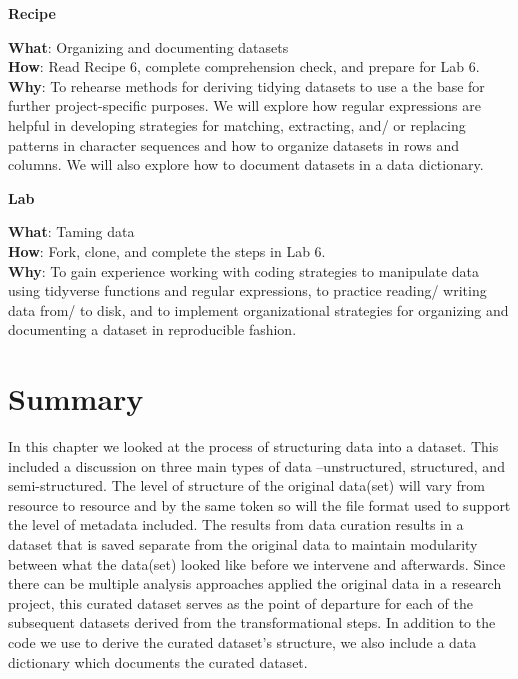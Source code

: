 \documentclass[
  letterpaper,
]{latex/krantz}
\theoremstyle{definition}
\theoremstyle{remark}
\begin{document}
\begin{tcolorbox}[enhanced jigsaw, breakable, leftrule=.75mm, arc=.35mm, colframe=quarto-callout-color-frame, colback=white, left=2mm, bottomrule=.15mm, rightrule=.15mm, toprule=.15mm, opacityback=0]

\textbf{ Recipe}

\textbf{What}: Organizing and documenting datasets\\
\textbf{How}: Read Recipe 6, complete comprehension check, and prepare
for Lab 6.\\
\textbf{Why}: To rehearse methods for deriving tidying datasets to use a
the base for further project-specific purposes. We will explore how
regular expressions are helpful in developing strategies for matching,
extracting, and/ or replacing patterns in character sequences and how to
organize datasets in rows and columns. We will also explore how to
document datasets in a data dictionary.

\end{tcolorbox}

\begin{tcolorbox}[enhanced jigsaw, breakable, leftrule=.75mm, arc=.35mm, colframe=quarto-callout-color-frame, colback=white, left=2mm, bottomrule=.15mm, rightrule=.15mm, toprule=.15mm, opacityback=0]

\textbf{ Lab}

\textbf{What}: Taming data\\
\textbf{How}: Fork, clone, and complete the steps in Lab 6.\\
\textbf{Why}: To gain experience working with coding strategies to
manipulate data using tidyverse functions and regular expressions, to
practice reading/ writing data from/ to disk, and to implement
organizational strategies for organizing and documenting a dataset in
reproducible fashion.

\end{tcolorbox}

\section*{Summary}\label{summary-5}


In this chapter we looked at the process of structuring data into a
dataset. This included a discussion on three main types of data
--unstructured, structured, and semi-structured. The level of structure
of the original data(set) will vary from resource to resource and by the
same token so will the file format used to support the level of metadata
included. The results from data curation results in a dataset that is
saved separate from the original data to maintain modularity between
what the data(set) looked like before we intervene and afterwards. Since
there can be multiple analysis approaches applied the original data in a
research project, this curated dataset serves as the point of departure
for each of the subsequent datasets derived from the transformational
steps. In addition to the code we use to derive the curated dataset's
structure, we also include a data dictionary which documents the curated
dataset.
\end{document}
